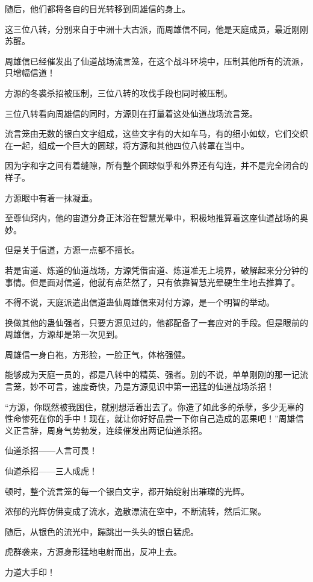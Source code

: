 \begin{this_body}
随后，他们都将各自的目光转移到周雄信的身上。

这三位八转，分别来自于中洲十大古派，而周雄信不同，他是天庭成员，最近刚刚苏醒。

周雄信已经催发出了仙道战场流言笼，在这个战斗环境中，压制其他所有的流派，只增幅信道！

方源的冬裘杀招被压制，三位八转的攻伐手段也同时被压制。

三位八转看向周雄信的同时，方源则在打量着这处仙道战场流言笼。

流言笼由无数的银白文字组成，这些文字有的大如车马，有的细小如蚁，它们交织在一起，组成一个巨大的圆球，将方源和其他四位八转罩在当中。

因为字和字之间有着缝隙，所有整个圆球似乎和外界还有勾连，并不是完全闭合的样子。

方源眼中有着一抹凝重。

至尊仙窍内，他的宙道分身正沐浴在智慧光晕中，积极地推算着这座仙道战场的奥妙。

但是关于信道，方源一点都不擅长。

若是宙道、炼道的仙道战场，方源凭借宙道、炼道准无上境界，破解起来分分钟的事情。但是面对信道，他就有点茫然了，只有依靠智慧光晕硬生生地去推算了。

不得不说，天庭派遣出信道蛊仙周雄信来对付方源，是一个明智的举动。

换做其他的蛊仙强者，只要方源见过的，他都配备了一套应对的手段。但是眼前的周雄信，方源却是第一次见到。

周雄信一身白袍，方形脸，一脸正气，体格强健。

能够成为天庭一员的，都是八转中的精英、强者。别的不说，单单刚刚的那一记流言笼，妙不可言，速度奇快，乃是方源见识中第一迅猛的仙道战场杀招！

“方源，你既然被我困住，就别想活着出去了。你造了如此多的杀孽，多少无辜的性命惨死在你的手中！现在，就让你好好品尝一下你自己造成的恶果吧！”周雄信义正言辞，周身气势勃发，连续催发出两记仙道杀招。

仙道杀招——人言可畏！

仙道杀招——三人成虎！

顿时，整个流言笼的每一个银白文字，都开始绽射出璀璨的光辉。

浓郁的光辉仿佛变成了流水，逸散漂流在空中，不断流转，然后汇聚。

随后，从银色的流光中，蹦跳出一头头的银白猛虎。

虎群袭来，方源身形猛地电射而出，反冲上去。

力道大手印！


\end{this_body}
